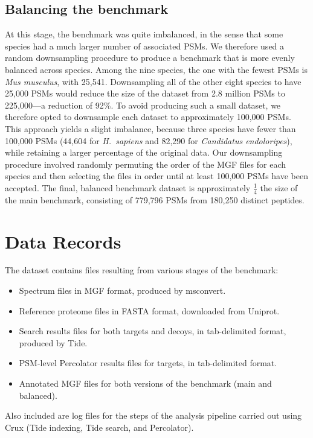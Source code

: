 \documentclass{article}
\begin{document}
\subsection*{Balancing the benchmark}

At this stage, the benchmark was quite imbalanced, in the sense that some species had a much larger number of associated PSMs.
We therefore used a random downsampling procedure to produce a benchmark that is more evenly balanced across species.
Among the nine species, the one with the fewest PSMs is \textit{Mus musculus}, with 25,541.
Downsampling all of the other eight species to have 25,000 PSMs would reduce the size of the dataset from 2.8 million PSMs to 225,000---a reduction of 92\%.
To avoid producing such a small dataset, we therefore opted to downsample each dataset to approximately 100,000 PSMs.
This approach yields a slight imbalance, because three species have fewer than 100,000 PSMs (44,604 for \textit{H.\ sapiens} and 82,290 for \textit{Candidatus endoloripes}), while retaining a larger percentage of the original data.
Our downsampling procedure involved randomly permuting the order of the MGF files for each species and then selecting the files in order until at least 100,000 PSMs have been accepted.
The final, balanced benchmark dataset is approximately $\frac{1}{4}$ the size of the main benchmark, consisting of 779,796 PSMs from 180,250 distinct peptides.

\section*{Data Records}

The dataset contains files resulting from various stages of the benchmark:
\begin{itemize}
\item Spectrum files in MGF format, produced by msconvert.
\item Reference proteome files in FASTA format, downloaded from Uniprot.
\item Search results files for both targets and decoys, in tab-delimited format, produced by Tide.
\item PSM-level Percolator results files for targets, in tab-delimited format.
\item Annotated MGF files for both versions of the benchmark (main and balanced).
\end{itemize}
Also included are log files for the steps of the analysis pipeline carried out using Crux \cite{park2008rapid} (Tide indexing, Tide search, and Percolator).
\end{document}
